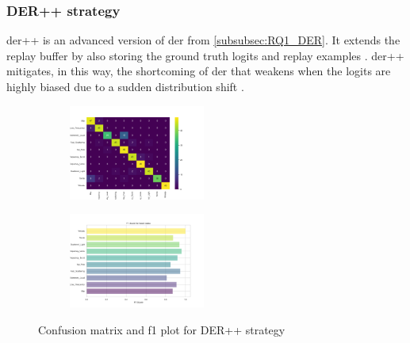 \subsubsection{DER++ strategy}
\label{subsubsec:RQ1_DER++}
\acrfull{der++} is an advanced version of \acrshort{der} from \ref{subsubsec:RQ1_DER}. It extends the replay buffer by also storing the ground truth logits and replay examples \citep{buzzega2020dark}. \acrshort{der++} mitigates, in this way, the shortcoming of \acrshort{der} that weakens when the logits are highly biased due to a sudden distribution shift \citep{ling2022difficulty}. 

\begin{figure}[H]
\centering
\begin{subfigure}
  \centering
  \includegraphics[width=0.49\textwidth]{Images/cm_DER++_MultiView_100epochs.png}  
  \label{fig:sub-first}
\end{subfigure}
\begin{subfigure}
  \centering
  \includegraphics[width=0.49\textwidth]{Images/f1_DER++_MultiView_100epochs.png}  
  \label{fig:sub-second}
\end{subfigure}
\caption{Confusion matrix and f1 plot for DER++ strategy}
\label{fig:cm_f1_der++_baseline}
\end{figure}
